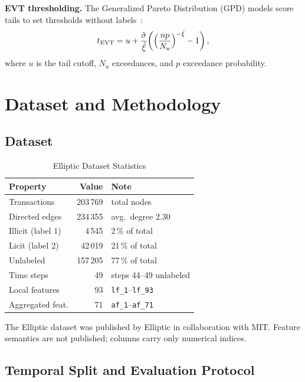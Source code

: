\documentclass[conference]{IEEEtran}
\begin{document}
\textbf{EVT thresholding.}  The Generalized Pareto Distribution (GPD) models
score tails to set thresholds without labels~\cite{siffer2017}:
\begin{equation}
t_{\text{EVT}} = u + \frac{\hat{\sigma}}{\hat{\xi}}\!\left(
\Bigl(\frac{n p}{N_u}\Bigr)^{-\hat{\xi}} - 1\right),
\label{eq:evt}
\end{equation}
where $u$ is the tail cutoff, $N_u$ exceedances, and $p$ exceedance
probability.

\section{Dataset and Methodology}

\subsection{Dataset}
\label{sec:dataset}

\begin{table}[htbp]
\centering
\caption{Elliptic Dataset Statistics}
\label{tab:dataset}
\renewcommand{\arraystretch}{1.1}
\begin{tabular}{@{}lrl@{}}
\toprule
Property & Value & Note \\
\midrule
Transactions     & 203\,769 & total nodes \\
Directed edges   & 234\,355 & avg.\ degree 2.30 \\
Illicit (label 1)& 4\,545   & 2\,\% of total \\
Licit (label 2)  & 42\,019  & 21\,\% of total \\
Unlabeled        & 157\,205 & 77\,\% of total \\
Time steps       & 49       & steps 44--49 unlabeled \\
Local features   & 93       & \texttt{lf\_1}--\texttt{lf\_93} \\
Aggregated feat. & 71       & \texttt{af\_1}--\texttt{af\_71} \\
\bottomrule
\end{tabular}
\end{table}

The Elliptic dataset was published by Elliptic in collaboration with MIT.  Feature
semantics are not published; columns carry only numerical indices.

\subsection{Temporal Split and Evaluation Protocol}
\end{document}
